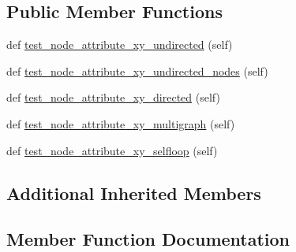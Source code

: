 \subsection*{Public Member Functions}
\begin{DoxyCompactItemize}
\item 
def \hyperlink{classnetworkx_1_1algorithms_1_1assortativity_1_1tests_1_1test__pairs_1_1TestAttributeMixingXY_aa66f833e37e07d71033b181eb37fbfd4}{test\+\_\+node\+\_\+attribute\+\_\+xy\+\_\+undirected} (self)
\item 
def \hyperlink{classnetworkx_1_1algorithms_1_1assortativity_1_1tests_1_1test__pairs_1_1TestAttributeMixingXY_a4b7565c731976357ed066145a3ebed71}{test\+\_\+node\+\_\+attribute\+\_\+xy\+\_\+undirected\+\_\+nodes} (self)
\item 
def \hyperlink{classnetworkx_1_1algorithms_1_1assortativity_1_1tests_1_1test__pairs_1_1TestAttributeMixingXY_aba5d01e005c59a11ee54d7820e958dac}{test\+\_\+node\+\_\+attribute\+\_\+xy\+\_\+directed} (self)
\item 
def \hyperlink{classnetworkx_1_1algorithms_1_1assortativity_1_1tests_1_1test__pairs_1_1TestAttributeMixingXY_ac1f26db696b07ade360bd4751ddb3bc3}{test\+\_\+node\+\_\+attribute\+\_\+xy\+\_\+multigraph} (self)
\item 
def \hyperlink{classnetworkx_1_1algorithms_1_1assortativity_1_1tests_1_1test__pairs_1_1TestAttributeMixingXY_a6a9901d22a1e63c850d992cf3fd41aa0}{test\+\_\+node\+\_\+attribute\+\_\+xy\+\_\+selfloop} (self)
\end{DoxyCompactItemize}
\subsection*{Additional Inherited Members}


\subsection{Member Function Documentation}
\mbox{\label{classnetworkx_1_1algorithms_1_1assortativity_1_1tests_1_1test__pairs_1_1TestAttributeMixingXY_aba5d01e005c59a11ee54d7820e958dac}} 
